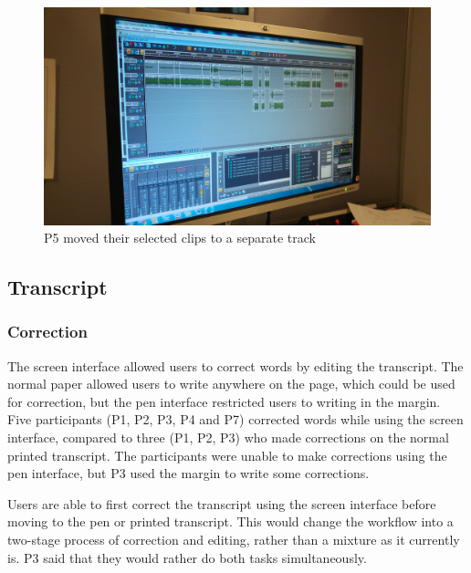 \begin{figure}[h]
  \centering
  \includegraphics[width=\columnwidth]{figs/pen-screen-p5-lowres.jpg}
  \caption{P5 moved their selected clips to a separate track}
  \label{fig:p5-screen}
\end{figure}


\subsection{Transcript}

\subsubsection{Correction}


The screen interface allowed users to correct words by editing the transcript. The normal paper allowed users to write
anywhere on the page, which could be used for correction, but the pen interface restricted users to writing in the
margin.  Five participants (P1, P2, P3, P4 and P7) corrected words while using the screen interface, compared to three
(P1, P2, P3) who made corrections on the normal printed transcript. The participants were unable to make corrections
using the pen interface, but P3 used the margin to write some corrections. 

Users are able to first correct the transcript using the screen interface before moving to the pen or printed
transcript.  This would change the workflow into a two-stage process of correction and editing, rather than a mixture
as it currently is. P3 said that they would rather do both tasks simultaneously.

